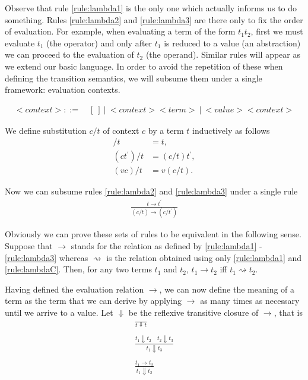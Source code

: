 Observe that rule \eqref{rule:lambda1} is the only one which actually informs us to do something. Rules \eqref{rule:lambda2} and \eqref{rule:lambda3} are there only to fix the order of evaluation. For example, when evaluating a term of the form $t_1 t_2$, first we must evaluate $t_1$ (the operator) and only after $t_1$ is reduced to a value (an abstraction) we can proceed to the evaluation of $t_2$ (the operand). Similar rules will appear as we extend our basic language. In order to avoid the repetition of these when defining the transition semantics, we will subsume them under a single framework: evaluation contexts. 

\begin{align*}
{<}context{>} ::= \quad [ \ ] \ | \ {<}context{>} {<}term{>} \ | \ {<}value{>} {<}context{>}  \tag{context}
\end{align*}

We define substitution $c/t$ of context $c$ by a term $t$ inductively as follows 
\begin{align*}
[ \ ] / t &= t, \\
(ct^{'})/t &= (c/t)t^{'},\\
(vc)/t &= v (c/t).
\end{align*}

Now we can subsume rules \eqref{rule:lambda2} and \eqref{rule:lambda3} under a single rule
\begin{align*}
\frac
{t \to t^{'}}
{(c/t) \to (c/t^{'})}  \label{rule:lambdaC} \tag{$\lambda C$} 
\end{align*}

Obviously we can prove these sets of rules to be equivalent in the following sense. Suppose that $\to$ stands for the relation as defined by \eqref{rule:lambda1} - \eqref{rule:lambda3} whereas $\rightsquigarrow$ is the relation obtained using  only \eqref{rule:lambda1} and \eqref{rule:lambdaC}. Then, for any two terms $t_1$ and $t_2$, $t_1 \to t_2$ iff $t_1 \rightsquigarrow t_2$. 

Having defined the evaluation relation $\to$, we can now define the meaning of a term as the term that we can derive by applying $\to$ as many times as necessary until we arrive to a value. Let $\Downarrow$ be the reflexive transitive closure of $\to$, that is
\begin{align*}
\frac
{}
{t \Downarrow t} \tag{reflexivity}\\
\\
\frac
{t_1 \Downarrow t_2 \quad t_2 \Downarrow t_3}
{t_1 \Downarrow t_3} \tag{transitivity}\\
\\
\frac
{t_1 \to t_2}
{t_1 \Downarrow t_2} \tag{closure}
\end{align*}


